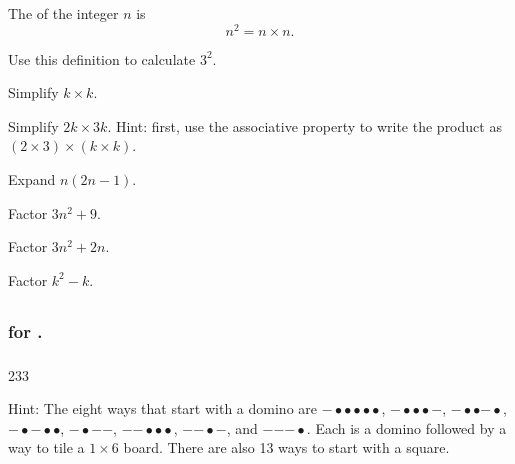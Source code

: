 \begin{exer} [\exerE]%
\label{exer_square_algebra}
    The  of the integer $n$ is 
    $$n^2 = n \times n.$$
    \begin{exerpart}
        \item Use this definition to calculate $3^2$.
        \item Simplify $k \times k$.
        \item Simplify $2k \times 3k$.  Hint: first, use the associative property to write the product as $(2 \times 3) \times (k \times k)$.
        \item Expand $n(2n-1)$.
        \item Factor $3n^2+9$.
        \item Factor $3n^2+2n$.
        \item Factor $k^2 - k$.
    \end{exerpart}
\end{exer}


\subsection{\answers}


\subsubsection{\answers for  \subsqdom.}

\subsubsection*{ \answers}
\begin{apart}
    \item 233
    \item Hint: The eight ways that start with a domino are $\boldsymbol{-}\bullet\bullet\bullet\bullet\bullet$, 
    $\boldsymbol{-}\bullet\bullet\bullet\boldsymbol{-}$,
    $\boldsymbol{-}\bullet\bullet\boldsymbol{-}\bullet$,
    $\boldsymbol{-}\bullet\boldsymbol{-}\bullet\bullet$,  
    $\boldsymbol{-}\bullet\boldsymbol{-}\boldsymbol{-}$,
    $\boldsymbol{-}\boldsymbol{-}\bullet\bullet\bullet$,
    $\boldsymbol{-}\boldsymbol{-}\bullet\boldsymbol{-}$, and
    $\boldsymbol{-}\boldsymbol{-}\boldsymbol{-}\bullet$.  Each is a domino followed by a way to tile a $1 \times 6$ board.
    There are also 13 ways to start with a square.
\end{apart}

